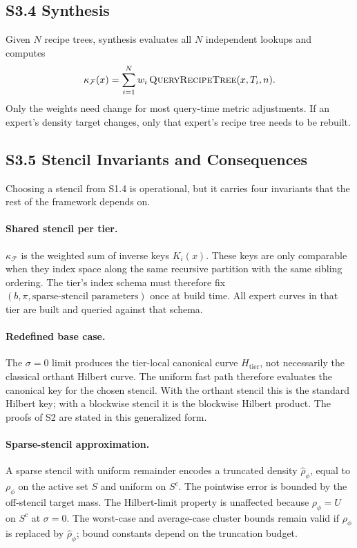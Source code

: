 \documentclass[11pt]{article}
\newcommand{\kappaf}{\kappa_{\mathcal F}}
\newcommand{\rhophi}{\rho_{\phi}}
\begin{document}
\subsection*{S3.4 Synthesis}
Given $N$ recipe trees, synthesis evaluates all $N$ independent lookups and computes
\[
\kappaf(x)=\sum_{i=1}^Nw_i\,\Call{QueryRecipeTree}{x,T_i,n}.
\]
Only the weights need change for most query-time metric adjustments. If an expert's density target changes, only that expert's recipe tree needs to be rebuilt.

\subsection*{S3.5 Stencil Invariants and Consequences}
\label{sec:si-stencil-invariants}
Choosing a stencil from S1.4 is operational, but it carries four invariants that the rest of the framework depends on.

\paragraph{Shared stencil per tier.}
$\kappaf$ is the weighted sum of inverse keys $K_i(x)$. These keys are only comparable when they index space along the same recursive partition with the same sibling ordering. The tier's index schema must therefore fix $(b,\pi,\text{sparse-stencil parameters})$ once at build time. All expert curves in that tier are built and queried against that schema.

\paragraph{Redefined base case.}
The $\sigma=0$ limit produces the tier-local canonical curve $H_{\mathrm{tier}}$, not necessarily the classical orthant Hilbert curve. The uniform fast path therefore evaluates the canonical key for the chosen stencil. With the orthant stencil this is the standard Hilbert key; with a blockwise stencil it is the blockwise Hilbert product. The proofs of S2 are stated in this generalized form.

\paragraph{Sparse-stencil approximation.}
A sparse stencil with uniform remainder encodes a truncated density $\hat\rhophi$, equal to $\rhophi$ on the active set $S$ and uniform on $S^c$. The pointwise error is bounded by the off-stencil target mass. The Hilbert-limit property is unaffected because $\rhophi=U$ on $S^c$ at $\sigma=0$. The worst-case and average-case cluster bounds remain valid if $\rhophi$ is replaced by $\hat\rhophi$; bound constants depend on the truncation budget.
\end{document}
